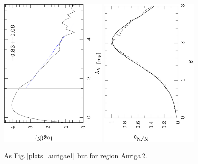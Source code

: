 \documentclass[useAMS,usenatbib]{mn2e}
\begin{document}
\begin{appendix}
\begin{figure}
\includegraphics[height=7.5cm,angle=-90]{av_dist_aurigae2.ps}
\hfill
\includegraphics[height=7.5cm,angle=-90]{histo_aurigae2.ps}
\caption{\label{plots_aurigae2} As Fig.\,\ref{plots_aurigae1} but for region
Auriga\,2.}  

\end{figure}


\end{appendix}
\end{document}
